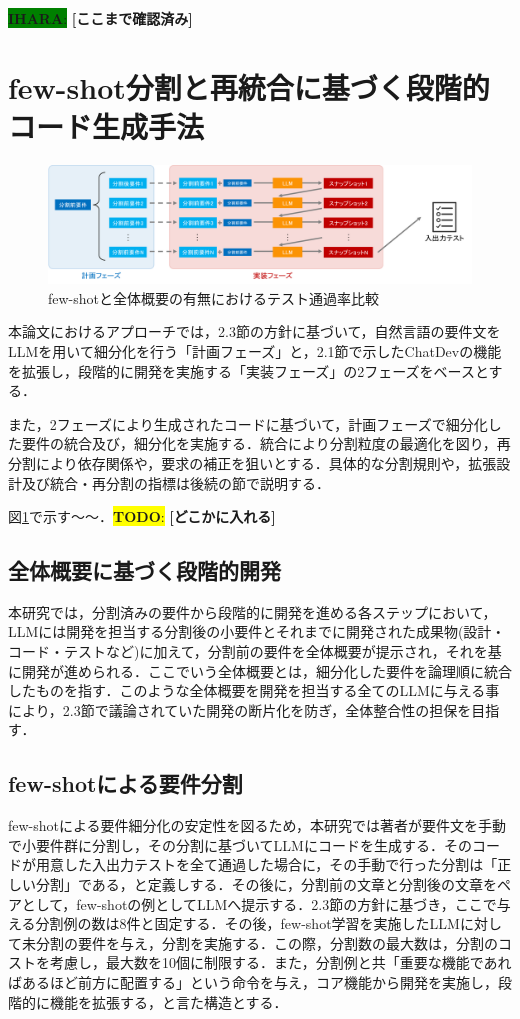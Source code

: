\documentclass[submit,techrep,noauthor]{ipsj}
\newcommand{\todo}[1]{\colorbox{yellow}{{\bf TODO}:}{\color{red} {\textbf{[#1]}}}}
\newcommand{\ihara}[1]{\colorbox{green}{{\bf IHARA}:}{\color{blue} {\textbf{[#1]}}}}
\begin{document}
\ihara{ここまで確認済み}

\section{few-shot分割と再統合に基づく段階的コード生成手法}
\label{sec:method}
\begin{figure}[t]
    \centering
    \includegraphics[width=1.0\linewidth]{./Toyoshima_fig/approach_abst_v2.pdf}
    \caption{few-shotと全体概要の有無におけるテスト通過率比較\protect\footnotemark}
    \label{approach_abst}
\end{figure}

本論文におけるアプローチでは，2.3節の方針に基づいて，自然言語の要件文をLLMを用いて細分化を行う「計画フェーズ」と，2.1節で示したChatDevの機能を拡張し，段階的に開発を実施する「実装フェーズ」の2フェーズをベースとする．

また，2フェーズにより生成されたコードに基づいて，計画フェーズで細分化した要件の統合及び，細分化を実施する．統合により分割粒度の最適化を図り，再分割により依存関係や，要求の補正を狙いとする．具体的な分割規則や，拡張設計及び統合・再分割の指標は後続の節で説明する．

図\ref{approach_abst}で示す〜〜．\todo{どこかに入れる}


\subsection{全体概要に基づく段階的開発}
本研究では，分割済みの要件から段階的に開発を進める各ステップにおいて，LLMには開発を担当する分割後の小要件とそれまでに開発された成果物(設計・コード・テストなど)に加えて，分割前の要件を全体概要が提示され，それを基に開発が進められる．ここでいう全体概要とは，細分化した要件を論理順に統合したものを指す．このような全体概要を開発を担当する全てのLLMに与える事により，2.3節で議論されていた開発の断片化を防ぎ，全体整合性の担保を目指す．

\subsection{few-shotによる要件分割}
few-shotによる要件細分化の安定性を図るため，本研究では著者が要件文を手動で小要件群に分割し，その分割に基づいてLLMにコードを生成する．そのコードが用意した入出力テストを全て通過した場合に，その手動で行った分割は「正しい分割」である，と定義しする．その後に，分割前の文章と分割後の文章をペアとして，few-shotの例としてLLMへ提示する．2.3節の方針に基づき，ここで与える分割例の数は8件と固定する．その後，few-shot学習を実施したLLMに対して未分割の要件を与え，分割を実施する．この際，分割数の最大数は，分割のコストを考慮し，最大数を10個に制限する．また，分割例と共「重要な機能であればあるほど前方に配置する」という命令を与え，コア機能から開発を実施し，段階的に機能を拡張する，と言た構造とする．
\end{document}
